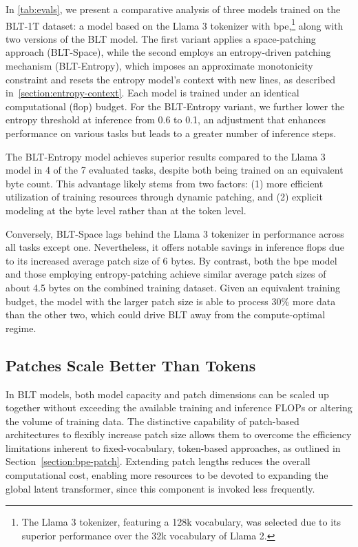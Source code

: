 In \autoref{tab:evals}, we present a comparative analysis of three models trained on the {\textsc BLT}-1T dataset: a model based on the Llama 3 tokenizer with bpe,\footnote{The Llama 3 tokenizer, featuring a 128k vocabulary, was selected due to its superior performance over the 32k vocabulary of Llama 2.} along with two versions of the {\textsc BLT} model. The first variant applies a space-patching approach ({\textsc BLT}-Space), while the second employs an entropy-driven patching mechanism ({\textsc BLT}-Entropy), which imposes an approximate monotonicity constraint and resets the entropy model's context with new lines, as described in~\autoref{section:entropy-context}. Each model is trained under an identical computational (flop) budget. For the {\textsc BLT}-Entropy variant, we further lower the entropy threshold at inference from 0.6 to 0.1, an adjustment that enhances performance on various tasks but leads to a greater number of inference steps.

The {\textsc BLT}-Entropy model achieves superior results compared to the Llama 3 model in 4 of the 7 evaluated tasks, despite both being trained on an equivalent byte count. This advantage likely stems from two factors: (1) more efficient utilization of training resources through dynamic patching, and (2) explicit modeling at the byte level rather than at the token level.

Conversely, {\textsc BLT}-Space lags behind the Llama 3 tokenizer in performance across all tasks except one. Nevertheless, it offers notable savings in inference flops due to its increased average patch size of 6 bytes. By contrast, both the bpe model and those employing entropy-patching achieve similar average patch sizes of about 4.5 bytes on the combined training dataset. Given an equivalent training budget, the model with the larger patch size is able to process 30\% more data than the other two, which could drive {\textsc BLT} away from the compute-optimal regime.

\subsection{Patches Scale Better Than Tokens} In {\textsc BLT} models, both model capacity and patch dimensions can be scaled up together without exceeding the available training and inference FLOPs or altering the volume of training data. The distinctive capability of patch-based architectures to flexibly increase patch size allows them to overcome the efficiency limitations inherent to fixed-vocabulary, token-based approaches, as outlined in Section~\ref{section:bpe-patch}. Extending patch lengths reduces the overall computational cost, enabling more resources to be devoted to expanding the global latent transformer, since this component is invoked less frequently.

